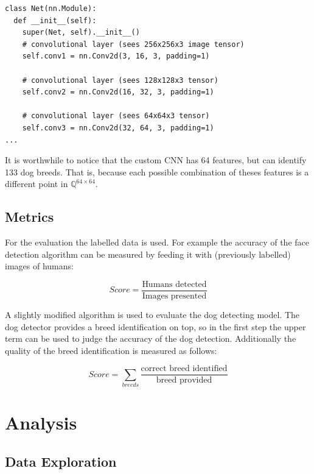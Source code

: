 \documentclass[paper=A4, DIV=calc, parskip=half]{scrartcl}
\begin{document}
\begin{lstlisting}[caption=Custom Design CNN, label=custom_cnn]
class Net(nn.Module):
  def __init__(self):
    super(Net, self).__init__()
    # convolutional layer (sees 256x256x3 image tensor)
    self.conv1 = nn.Conv2d(3, 16, 3, padding=1)
    
    # convolutional layer (sees 128x128x3 tensor)
    self.conv2 = nn.Conv2d(16, 32, 3, padding=1)
    
    # convolutional layer (sees 64x64x3 tensor)
    self.conv3 = nn.Conv2d(32, 64, 3, padding=1)
...
\end{lstlisting}

It is worthwhile to notice that the custom CNN has 64 features, but can identify
133 dog breeds. That is, because each possible combination of theses features
is a different point in $\mathbb{Q}^{64\times64}$. 


\subsection*{Metrics}

For the evaluation the labelled data is used. For example the accuracy of the face
detection algorithm can be measured by feeding it with (previously labelled) images of
humans: 

$$ Score = \frac{\textrm{Humans detected}}{\textrm{Images presented}}$$

A slightly modified algorithm is used to evaluate the dog detecting model. The dog
detector provides a breed identification on top, so in the first step the upper term can
be used to judge the accuracy of the dog detection. Additionally the quality of the breed
identification is measured as follows:

$$ Score = \sum_{breeds}{\frac{\textrm{correct breed identified}}{\textrm{breed provided}}} $$



\section*{Analysis}

\subsection*{Data Exploration}
\end{document}
